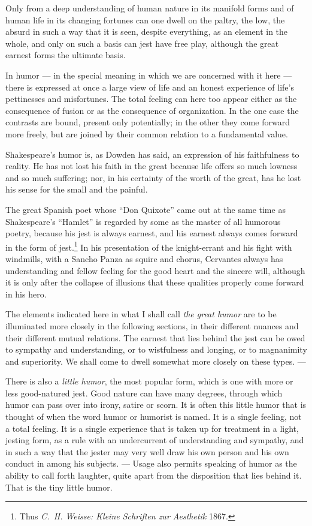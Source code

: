 \documentclass[12pt]{book}
\newcommand{\opage}[1]{\marginnote{\footnotesize\textit{[#1]}}}
\begin{document}
Only from a deep understanding of human nature in its manifold forms and of human
life in its changing fortunes can one dwell on the paltry, the low, the absurd in
such a way that it is seen, despite everything, as an element in the whole, and
only on such a basis can jest have free play, although the great earnest forms the
ultimate basis.

In humor --- in the special meaning in which we are concerned with it here ---
there is expressed at once a large view of life and an honest experience of
life's pettinesses and misfortunes. The total feeling can here too appear either
as the consequence of fusion or as the consequence of organization. In the one
case the contrasts are bound, present only potentially; in the other they come
forward more freely, but are joined by their common relation to a fundamental
value.

Shakespeare's humor is, as Dowden has said, an expression of his faithfulness to
reality. He has not lost his faith in the great because life offers so much
lowness and so much suffering; nor, in his certainty of the worth of the great, has
he lost his sense for the small and the painful.

The great Spanish poet whose ``Don Quixote'' came out at the same time as
Shakespeare's ``Hamlet'' is regarded by some as the master of all humorous poetry,
because his jest is always earnest, and \opage{44}his earnest always comes forward
in the form of jest.\footnote{Thus \textit{C.~H. Weisse: Kleine Schriften zur
Aesthetik} 1867.} In his presentation of the knight-errant and his fight with
windmills, with a Sancho Panza as squire and chorus, Cervantes always has
understanding and fellow feeling for the good heart and the sincere will, although
it is only after the collapse of illusions that these qualities properly come
forward in his hero.

The elements indicated here in what I shall call \emph{the great humor} are to be
illuminated more closely in the following sections, in their different nuances and
their different mutual relations. The earnest that lies behind the jest can be owed
to sympathy and understanding, or to wistfulness and longing, or to magnanimity and
superiority. We shall come to dwell somewhat more closely on these types. ---

There is also a \emph{little humor}, the most popular form, which is one with more
or less good-natured jest. Good nature can have many degrees, through which humor
can pass over into irony, satire or scorn. It is often this little humor that is
thought of when the word humor or humorist is named. It is a single feeling, not a
total feeling. It is a single experience that is taken up for treatment in a light,
jesting form, as a rule with an undercurrent of understanding and sympathy, and in
such a way that the jester may very well draw his own person and his own conduct
in among his subjects. --- Usage also permits speaking of humor as the ability to
call forth laughter, quite apart from the disposition that lies behind it. That is
the tiny little humor.
\end{document}
